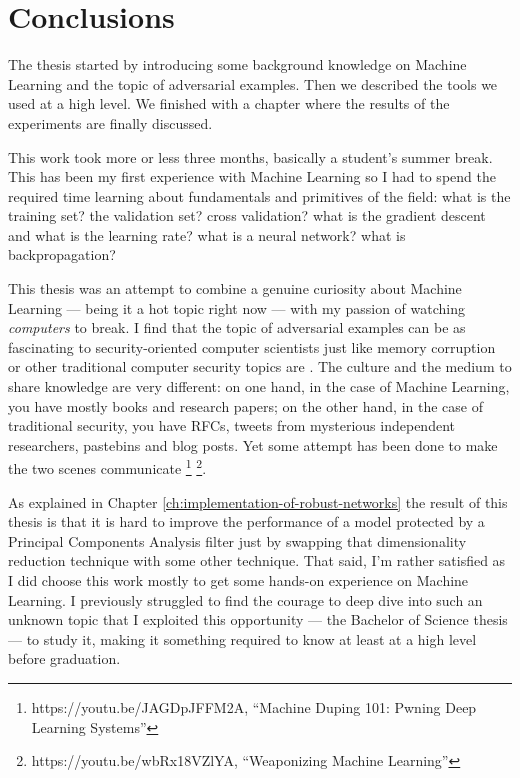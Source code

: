 \chapter*{Conclusions}

The thesis started by introducing some background knowledge on Machine
Learning and the topic of adversarial examples. Then we described the
tools we used at a high level. We finished with a chapter where the
results of the experiments are finally discussed.

This work took more or less three months, basically a student's summer
break. This has been my first experience with Machine Learning so I had
to spend the required time learning about fundamentals and primitives
of the field: what is the training set? the validation set? cross
validation? what is the gradient descent and what is the learning rate?
what is a neural network? what is backpropagation?

This thesis was an attempt to combine a genuine curiosity about Machine
Learning --- being it a hot topic right now --- with my passion of
watching \emph{computers} to break. I find that the topic of
adversarial examples can be as fascinating to security-oriented
computer scientists just like memory corruption or other traditional
computer security topics are \cite{DBLP:journals/corr/PapernotMSW16}.
The culture and the medium to share knowledge are very different: on
one hand, in the case of Machine Learning, you have mostly books and
research papers; on the other hand, in the case of traditional
security, you have RFCs, tweets from mysterious independent
researchers, pastebins and blog posts. Yet some attempt has been done
to make the two scenes communicate%
\footnote{https://youtu.be/JAGDpJFFM2A, ``Machine Duping 101: Pwning
  Deep Learning Systems''}
\footnote{https://youtu.be/wbRx18VZlYA, ``Weaponizing Machine
  Learning''}.

As explained in Chapter \ref{ch:implementation-of-robust-networks} the
result of this thesis is that it is hard to improve the performance of
a model protected by a Principal Components Analysis filter just by
swapping that dimensionality reduction technique with some other
technique. That said, I'm rather satisfied as I did choose this work
mostly to get some hands-on experience on Machine Learning. I
previously struggled to find the courage to deep dive into such an
unknown topic that I exploited this opportunity --- the Bachelor of
Science thesis --- to study it, making it something required to know at
least at a high level before graduation.
